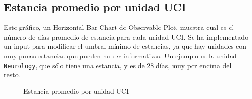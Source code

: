 \subsection{Estancia promedio por unidad UCI}
Este gráfico, un Horizontal Bar Chart \cite{hbarchart} de Observable Plot, muestra cual es el  número de días promedio de estancia para cada unidad UCI. Se ha implementado un input para modificar el umbral mínimo de estancias, ya que hay unidades con muy pocas estancias que pueden no ser informativas. Un ejemplo es la unidad \texttt{Neurology}, que sólo tiene una estancia, y es de 28 días, muy por encima del resto. 
\begin{figure}[H]
  \centering
  \caption{Estancia promedio por unidad UCI}
  \label{fig:chart-icu}
\end{figure}

